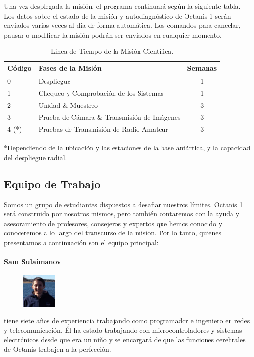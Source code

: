 \documentclass[a4paper,12pt]{article}
\begin{document}
Una vez desplegada la misión, el programa continuará según la siguiente tabla. Los datos sobre el estado de la misión y autodiagnóstico de Octanis 1 serán enviados varias veces al día de forma automática. Los comandos para cancelar, pausar o modificar la misión podrán ser enviados en cualquier momento.

\begin{table}[h!]
\centering
\begin{tabular}{ l | l | c }
\bfseries{Código} & \bfseries{Fases de la Misión} & \bfseries{Semanas} \\
\hline

0 & Despliegue & 1 \\
1 & Chequeo y Comprobación de los Sistemas & 1 \\
2 & Unidad \& Muestreo & 3 \\
3 & Prueba de Cámara \& Transmisión de Imágenes  & 3 \\
4 (*)& Pruebas de Transmisión de Radio Amateur  & 3 \\

\end{tabular}
\caption{Linea de Tiempo de la Misión Científica.}
*Dependiendo de la ubicación y las estaciones de la base antártica, y la capacidad del despliegue radial.

\end{table}

\pagebreak

\subsection{Equipo de Trabajo}

Somos un grupo de estudiantes dispuestos a desafiar nuestros límites. Octanis 1 será construido por nosotros mismos, pero también contaremos con la ayuda y asesoramiento de profesores, consejeros y expertos que hemos conocido y conoceremos a lo largo del transcurso de la misión. Por lo tanto, quienes presentamos a continuación son el equipo principal:


\paragraph{Sam Sulaimanov} 
\begin{figure}
    \centering
    \vspace{-13pt}
    \includegraphics[width=0.15\textwidth]{sam}
\end{figure} tiene siete años de experiencia trabajando como programador e ingeniero en redes y  telecomunicación. Él ha estado trabajando con microcontroladores y sistemas electrónicos desde que era un niño y se encargará de que las funciones cerebrales de Octanis trabajen a la perfección.
\\ \\
\end{document}
